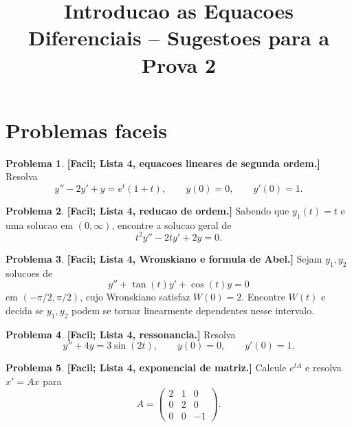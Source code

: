 \documentclass[10pt,a4paper]{amsart}
\title{Introducao as Equacoes Diferenciais -- Sugestoes para a Prova 2}
\theoremstyle{definition}
\newtheorem{problema}{Problema}
\begin{document}
\maketitle


\vspace{4mm}

\section*{Problemas faceis}

\begin{problema}
\textbf{[Facil; Lista 4, equacoes lineares de segunda ordem.]}
Resolva
\[
    y''-2y'+y=e^t(1+t),
    \qquad y(0)=0,\qquad y'(0)=1.
\]
\end{problema}

\begin{problema}
\textbf{[Facil; Lista 4, reducao de ordem.]}
Sabendo que $y_1(t)=t$ e uma solucao em $(0,\infty)$, encontre a solucao
geral de
\[
    t^2y''-2ty'+2y=0.
\]
\end{problema}

\begin{problema}
\textbf{[Facil; Lista 4, Wronskiano e formula de Abel.]}
Sejam $y_1,y_2$ solucoes de
\[
    y''+\tan(t)y'+\cos(t)y=0
\]
em $(-\pi/2,\pi/2)$, cujo Wronskiano satisfaz $W(0)=2$. Encontre $W(t)$ e
decida se $y_1,y_2$ podem se tornar linearmente dependentes nesse intervalo.
\end{problema}

\begin{problema}
\textbf{[Facil; Lista 4, ressonancia.]}
Resolva
\[
    y''+4y=3\sin(2t),
    \qquad y(0)=0,
    \qquad y'(0)=1.
\]
\end{problema}

\begin{problema}
\textbf{[Facil; Lista 4, exponencial de matriz.]}
Calcule $e^{tA}$ e resolva $x'=Ax$ para
\[
    A=\begin{pmatrix}
        2&1&0\\
        0&2&0\\
        0&0&-1
    \end{pmatrix}.
\]
\end{problema}
\end{document}
